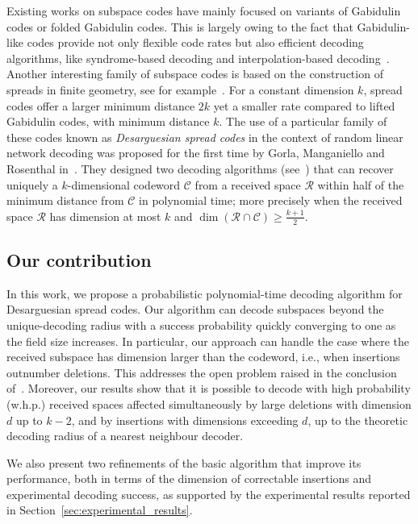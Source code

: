\documentclass{article}
\newcommand{\calC}{\mathcal{C}}
\newcommand{\calR}{\mathcal{R}}
\begin{document}
Existing works on subspace codes have mainly focused on variants of Gabidulin codes or folded Gabidulin codes.
This is largely owing to the fact that Gabidulin-like codes provide  not only flexible code rates but also efficient decoding algorithms, like syndrome-based decoding and interpolation-based decoding~\cite{Bartz2022,Gabidulin2022}. 
Another interesting family of subspace codes is based on the construction of spreads in finite geometry, see for example~\cite{Hirschfeld1998}. 
For a constant dimension $k$, spread codes offer a larger minimum distance $2k$ yet a smaller rate compared to lifted Gabidulin codes, with minimum distance $k$. 
The use of a particular family of these codes known as \textit{Desarguesian spread codes} in the context of random linear network decoding was proposed for the first time by Gorla, Manganiello and Rosenthal in~\cite{Gorla08}.
They designed two decoding algorithms (see~\cite{Gorla11,Gorla08}) that can recover uniquely a $k$-dimensional codeword $\calC$ from a received space $\calR$ within
half of the minimum distance from $\calC$ in polynomial time; more precisely when the received space $\calR$ has dimension at most $k$ and $\dim(\calR \cap \calC) \geq \frac{k+1}{2}$.


 \subsection{Our contribution}
In this work, we propose a probabilistic polynomial-time decoding algorithm for Desarguesian spread codes. Our algorithm can decode subspaces beyond the unique-decoding radius with a success probability quickly converging to one as the field size increases.
In particular, our approach can handle the case where the received subspace has dimension larger than the codeword, i.e., when insertions outnumber deletions. This addresses the open problem raised in the conclusion of~\cite{Gorla11}. Moreover, our results show that it is possible to decode with high probability (w.h.p.) received spaces affected simultaneously by large deletions with dimension $d$ up to $k-2$, and by insertions with dimensions exceeding $d$, up to the theoretic decoding radius of a nearest neighbour decoder.

We also present two refinements of the basic algorithm that improve its performance, both in terms of the dimension of correctable insertions and experimental decoding success, as supported by the experimental results reported in Section~\ref{sec:experimental_results}.
\end{document}
